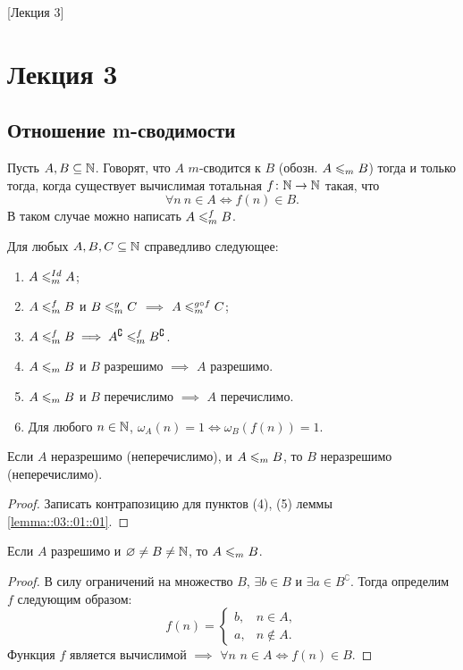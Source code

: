 [Лекция 3]

\section{Лекция 3}

\subsection{Отношение m-сводимости}

\begin{definition}
    Пусть $A, B \subseteq \mathbb{N}$.
    Говорят, что $A$ $m$-сводится к $B$ (обозн. $A \leqslant_{m} B$) тогда и только тогда, когда существует вычислимая тотальная $f \colon \mathbb{N} \to \mathbb{N}$ такая, что
    $$
        \forall n~ n \in A \iff f(n) \in B.
    $$
    В таком случае можно написать $A \leqslant_{m}^{f} B$.
\end{definition}

\begin{lemma} \label{lemma::03::01::01}
    Для любых $A, B, C \subseteq \mathbb{N}$ справедливо следующее:
    \begin{enumerate}
        \item $A \leqslant_{m}^{Id} A$;
        \item $A \leqslant_{m}^{f} B$ и $B \leqslant_{m}^{g} C$ $\implies$ $A \leqslant_{m}^{g \circ f} C$;
        \item $A \leqslant_{m}^{f} B \implies A^{\complement} \leqslant_{m}^{f} B^{\complement}$.
        \item $A \leqslant_{m} B$ и $B$ разрешимо $\implies$ $A$ разрешимо.
        \item $A \leqslant_{m} B$ и $B$ перечислимо $\implies$ $A$ перечислимо.
        \item Для любого $n \in \mathbb{N}$, $\omega_{A}(n) = 1 \iff \omega_{B}(f(n)) = 1$.
    \end{enumerate}
\end{lemma}

\begin{corollary}
    Если $A$ неразрешимо (неперечислимо), и $A \leqslant_{m} B$, то $B$ неразрешимо (неперечислимо).
\end{corollary}
\begin{proof}
    Записать контрапозицию для пунктов (4), (5) леммы \ref{lemma::03::01::01}.
\end{proof}

\begin{statement}
    Если $A$ разрешимо и $\varnothing \neq B \neq \mathbb{N}$, то $A \leqslant_{m} B$.
\end{statement}
\begin{proof}
    В силу ограничений на множество $B$, $\exists b \in B$ и $\exists a \in B^{\complement}$.
    Тогда определим $f$ следующим образом:
    $$
        f(n) = \begin{cases}
            b, & n \in A, \\
            a, & n \notin A.
        \end{cases}
    $$
    Функция $f$ является вычислимой $\implies$ $\forall n$ $n \in A \iff f(n) \in B$.
\end{proof}

